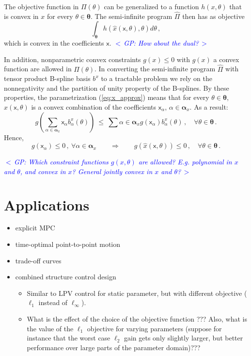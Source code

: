 \documentclass{article}
\newcommand{\commentGP}[1]{\noindent \textcolor{blue}{\emph{$<\,$GP: #1$\,>$}}}%
\newcommand{\ppar}{\theta}                          %
\newcommand{\Ppar}{{\bm{\theta}}}                   %
\newcommand{\bx}{b^x}               %
\newcommand{\bxa}{\bx_\alpha}       %
\newcommand{\cx}{\textsf{x}}        %
\newcommand{\cxa}{\cx_\alpha}       %
\newcommand{\Alpha}{\bm{\alpha}}    %
\begin{document}
The objective function in $\Pi(\ppar)$ can be generalized to a function $h(x,\ppar)$ that is convex in $x$ for every $\ppar\in\Ppar$. The semi-infinite program $\hat{\Pi}$ then has as objective
\[ \int_{\Ppar} h(\hat{x}(\cx,\ppar), \ppar) d\ppar\,,
\]
which is convex in the coefficients $\cx$. \commentGP{How about the dual?}

In addition, nonparametric convex constraints $g(x)\leq0$ with $g(x)$ a convex function are allowed in $\Pi(\ppar)$. In converting the semi-infinite program $\hat{\Pi}$ with tensor product B-spline basis $\bx$ to a tractable problem we rely on the nonnegativity and the partition of unity property of the B-splines. By these properties, the parametrization (\ref{eq:x_approx}) means that for every $\ppar\in\Ppar$, $\hat{x}(\cx,\ppar)$ is a convex combination of the coefficients $\cxa$, $\alpha\in\Alpha_x$. As a result:
\[ g\left(\sum_{\alpha\in\Alpha_x} \cxa \bxa(\ppar)\right) ~\leq~ \sum{\alpha\in\Alpha_x} g(\cxa) \bxa(\ppar)\,, \quad \forall \ppar\in\Ppar\,. %
\]
Hence,
\[ g(\cxa)\leq 0\,,~\forall \alpha\in\Alpha_x \qquad \Rightarrow \qquad g(\hat{x}(\cx,\ppar))\leq0\,,\quad\forall \ppar\in\Ppar\,.%
\]

\commentGP{Which constraint functions $g(x,\ppar)$ are allowed? E.g. polynomial in $x$ and $\ppar$, and convex in $x$? General jointly convex in $x$ and $\ppar$?}


\section{Applications}

\begin{itemize}
\item explicit MPC
\item time-optimal point-to-point motion
\item trade-off curves
\item combined structure control design
    \begin{itemize}
    \item Similar to LPV control for static parameter, but with different objective ($\ell_1$ instead of $\ell_\infty$).
    \item What is the effect of the choice of the objective function ??? Also, what is the value of the $\ell_1$ objective for varying parameters (suppose for instance that the worst case $\ell_2$ gain gets only slightly larger, but better performance over large parts of the parameter domain)???
    \end{itemize}
\end{itemize}
\end{document}

